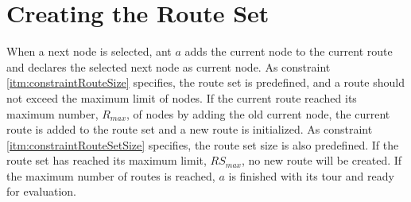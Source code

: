 \section{Creating the Route Set}

When a next node is selected, ant $a$ adds the current node to the current route and declares the selected next node as current node. As constraint \vref{itm:constraintRouteSize} specifies, the route set is predefined, and a route should not exceed the maximum limit of nodes. If the current route reached its maximum number, $R_{max}$, of nodes by adding the old current node, the current route is added to the route set and a new route is initialized. As constraint \vref{itm:constraintRouteSetSize} specifies, the route set size is also predefined. If the route set has reached its maximum limit, $RS_{max}$, no new route will be created. If the maximum number of routes is reached, $a$ is finished with its tour and ready for evaluation. 